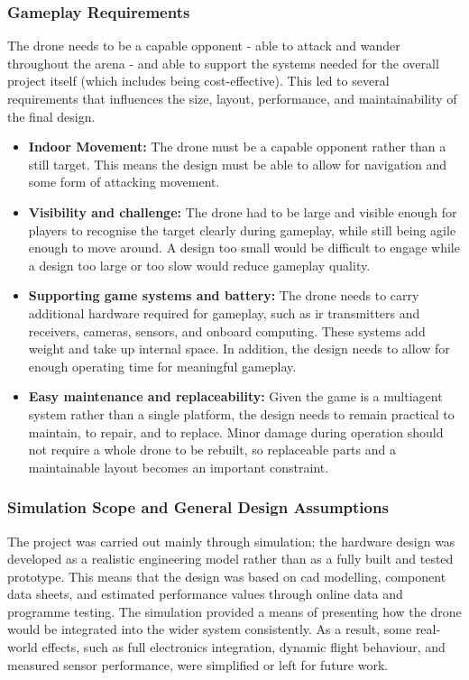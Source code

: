 \documentclass{report_template_oxford}
\begin{document}
\subsubsection{Gameplay Requirements}

 The drone needs to be a capable opponent - able to attack and wander throughout the arena - and able to support the systems needed for the overall project itself (which includes being cost-effective). This led to several requirements that influences the size, layout, performance, and maintainability of the final design.
\begin{itemize}
    \item \textbf{Indoor Movement: } The drone must be a capable opponent rather than a still target. This means the design must be able to allow for navigation and some form of attacking movement.
    \item \textbf{Visibility and challenge: } The drone had to be large and visible enough for players to recognise the target clearly during gameplay, while still being agile enough to move around. A design too small would be difficult to engage while a design too large or too slow would reduce gameplay quality.
    \item \textbf{Supporting game systems and battery: } The drone needs to carry additional hardware required for gameplay, such as \gls{ir} transmitters and receivers, cameras, sensors, and onboard computing. These systems add weight and take up internal space. In addition, the design needs to allow for enough operating time for meaningful gameplay.
    \item \textbf{Easy maintenance and replaceability: } Given the game is a multiagent system rather than a single platform, the design needs to remain practical to maintain, to repair, and to replace. Minor damage during operation should not require a whole drone to be rebuilt, so replaceable parts and a maintainable layout becomes an important constraint.
\end{itemize}

\subsubsection{Simulation Scope and General Design Assumptions}

The project was carried out mainly through simulation; the hardware design was developed as a realistic engineering model rather than as a fully built and tested prototype. This means that the design was based on \gls{cad} modelling, component data sheets, and estimated performance values through online data and programme testing. The simulation provided a means of presenting how the drone would be integrated into the wider system consistently. As a result, some real-world effects, such as full electronics integration, dynamic flight behaviour, and measured sensor performance, were simplified or left for future work.
\end{document}

